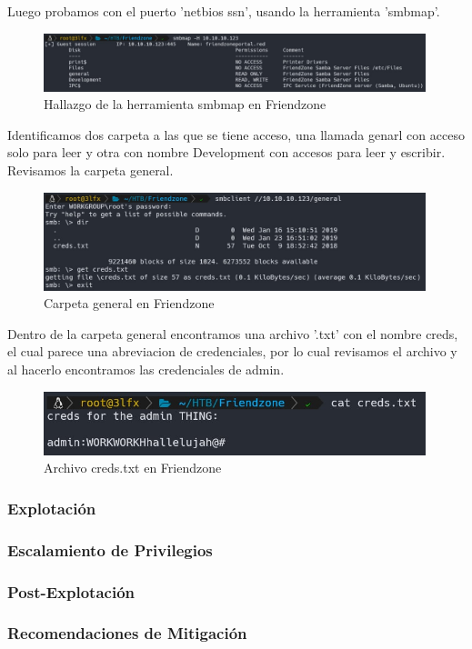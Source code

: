         \large{Luego probamos con el puerto 'netbios ssn', usando la herramienta 'smbmap'.}
        \par
        \begin{figure}[H]
            \centering
            \includegraphics[width=0.99\textwidth]{informe4/imagenes/friendzone/03_smbmap.png}
            \caption{Hallazgo de la herramienta smbmap en Friendzone} 
        \end{figure}

        \large{Identificamos dos carpeta a las que se tiene acceso, una llamada genarl con acceso solo para leer y otra con nombre Development con accesos para leer y escribir. Revisamos la carpeta general.}
        \par
        \begin{figure}[H]
            \centering
            \includegraphics[width=0.99\textwidth]{informe4/imagenes/friendzone/04_smb_creds.png}
            \caption{Carpeta general en Friendzone} 
        \end{figure}

        \large{Dentro de la carpeta general encontramos una archivo '.txt' con el nombre creds, el cual parece una abreviacion de credenciales, por lo cual revisamos el archivo y al hacerlo encontramos las credenciales de admin.}
        \par
        \begin{figure}[H]
            \centering
            \includegraphics[width=0.99\textwidth]{informe4/imagenes/friendzone/05_cred_friendzone.png}
            \caption{Archivo creds.txt en Friendzone} 
        \end{figure}




    \subsubsection{Explotación}

    \subsubsection{Escalamiento de Privilegios}

    \subsubsection{Post-Explotación}

    \subsubsection{Recomendaciones de Mitigación}

